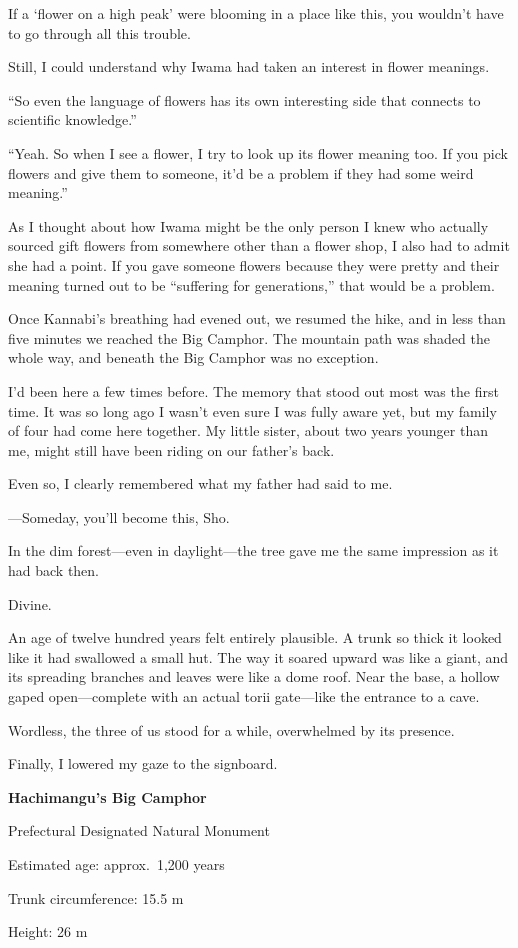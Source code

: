 \documentclass[
    a4paper,
    12pt,
    twoside,
    openany,
    UTF8,
    fontset=windows
]{ctexbook}
\begin{document}
If a `flower on a high peak' were blooming in a place like this, you wouldn't have to go through all this trouble.

Still, I could understand why Iwama had taken an interest in flower meanings.

``So even the language of flowers has its own interesting side that connects to scientific knowledge.''

``Yeah. So when I see a flower, I try to look up its flower meaning too. If you pick flowers and give them to someone, it'd be a problem if they had some weird meaning.''

As I thought about how Iwama might be the only person I knew who actually sourced gift flowers from somewhere other than a flower shop, I also had to admit she had a point. If you gave someone flowers because they were pretty and their meaning turned out to be ``suffering for generations,'' that would be a problem.

Once Kannabi's breathing had evened out, we resumed the hike, and in less than five minutes we reached the Big Camphor. The mountain path was shaded the whole way, and beneath the Big Camphor was no exception.

I'd been here a few times before. The memory that stood out most was the first time. It was so long ago I wasn't even sure I was fully aware yet, but my family of four had come here together. My little sister, about two years younger than me, might still have been riding on our father's back.

Even so, I clearly remembered what my father had said to me.

---Someday, you'll become this, Sho.

In the dim forest---even in daylight---the tree gave me the same impression as it had back then.

Divine.

An age of twelve hundred years felt entirely plausible. A trunk so thick it looked like it had swallowed a small hut. The way it soared upward was like a giant, and its spreading branches and leaves were like a dome roof. Near the base, a hollow gaped open---complete with an actual torii gate---like the entrance to a cave.

Wordless, the three of us stood for a while, overwhelmed by its presence.

Finally, I lowered my gaze to the signboard.

\begin{center}
{\bfseries
Hachimangu's Big Camphor

Prefectural Designated Natural Monument

Estimated age: approx.\ 1,200 years

Trunk circumference: 15.5 m

Height: 26 m
}
\end{center}
\end{document}
